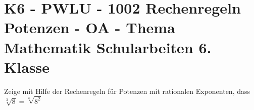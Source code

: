 \section{K6 - PWLU - 1002 Rechenregeln Potenzen - OA - Thema Mathematik Schularbeiten 6. Klasse}

\begin{beispiel}[K6 - PWLU]{1} %
			Zeige mit Hilfe der Rechenregeln für Potenzen mit rationalen Exponenten, dass $\sqrt[3]{8}=\sqrt[6]{8^2}$\leer
			
			\end{beispiel}